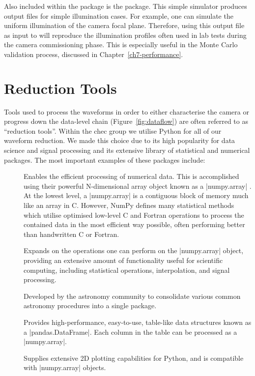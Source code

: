 Also included within the  package is the  package. This simple simulator produces  output files for simple illumination cases. For example, one can simulate the uniform illumination of the camera focal plane. Therefore, using this  output file as input to  will reproduce the illumination profiles often used in lab tests during the camera commissioning phase. This is especially useful in the Monte Carlo validation process, discussed in Chapter~\ref{ch7-performance}.

\section{Reduction Tools}
\lstset{language=C++}

Tools used to process the waveforms in order to either characterise the camera or progress down the data-level chain (Figure~\ref{fig:dataflow}) are often referred to as ``reduction tools''. Within the \gls{chec} group we utilise Python for all of our waveform reduction. We made this choice due to its high popularity for data science and signal processing and its extensive library of statistical and numerical packages. The most important examples of these packages include:

\begin{description}
\item []  Enables the efficient processing of numerical data. This is accomplished using their powerful N-dimensional array object known as a |numpy.array| \cite{VanderWalt2011}. At the lowest level, a |numpy.array| is a contiguous block of memory much like an array in C. However, NumPy defines many statistical methods which utilise optimised low-level C and Fortran operations to process the contained data in the most efficient way possible, often performing better than handwritten C or Fortran.
\item []  Expands on the operations one can perform on the |numpy.array| object, providing an extensive amount of functionality useful for scientific computing, including statistical operations, interpolation, and signal processing.
\item []  Developed by the astronomy community to consolidate various common astronomy procedures into a single package. 
\item []  Provides high-performance, easy-to-use, table-like data structures known as a |pandas.DataFrame|. Each column in the table can be processed as a |numpy.array|.
\item []  Supplies extensive 2D plotting capabilities for Python, and is compatible with |numpy.array| objects.
\end{description}

